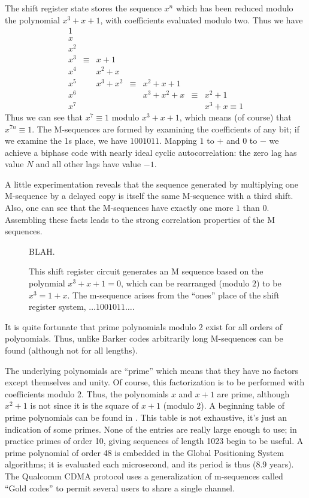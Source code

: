 The shift register state stores the sequence $x^n$ which has been
reduced modulo the polynomial $x^3 + x + 1$, with coefficients
evaluated modulo two.  Thus we have
\begin{equation}
\begin{array}{lclclcl}
1 \\
x \\
x^2 \\
x^3 &\equiv& x+1 \\
x^4 &      & x^2 + x \\
x^5 &      & x^3 + x^2 &\equiv& x^2 + x + 1 \\
x^6 &      &           &      & x^3 + x^2 + x &\equiv&x^2 + 1 \\
x^7 &      &           &      &               &  &x^3 + x \equiv 1
\end{array}
\end{equation}
Thus we can see that $x^7 \equiv 1$ modulo $x^3 + x + 1$, which means
(of course) that $x^{7n} \equiv 1$.  The M-sequences are formed by
examining the coefficients of any bit; if we examine the 1s place, we
have $1001011$.  Mapping $1$ to $+$ and $0$ to $-$ we achieve a
biphase code with nearly ideal cyclic autocorrelation: the zero lag
has value $N$ and all other lags have value $-1$.

A little experimentation reveals that the sequence generated by
multiplying one M-sequence by a delayed copy is itself the same
M-sequence with a third shift.  Also, one can see that the M-sequences
have exactly one more $1$ than $0$.  Assembling these facts leads to
the strong correlation properties of the M sequences.

\begin{figure}
\centerline{\textwidth {}}
BLAH.
\caption{\label{f:mseq1} This shift register circuit generates an M
sequence based on the polynmial $x^3 + x + 1 = 0$, which can be
rearranged (modulo $2$) to be $x^3 = 1 + x$.  The m-sequence arises
from the ``ones'' place of the shift register system, $\ldots 1001011\ldots$.}
\end{figure}

It is quite fortunate that prime polynomials modulo 2 exist for all
orders of polynomials.  Thus, unlike Barker codes arbitrarily long
M-sequences can be found (although not for all lengths).

The underlying polynomials are ``prime'' which means that they have no
factors except themselves and unity.  Of course, this factorization is
to be performed with coefficients modulo 2.  Thus, the polynomials $x$
and $x + 1$ are prime, although $x^2 + 1$ is not since it is the
square of $x+1$ (modulo 2).  A beginning table of prime polynomials
can be found in .  This table is not exhaustive, it's
just an indication of some primes.  None of the entries are really
large enough to use; in practice primes of order 10, giving sequences
of length 1023 begin to be useful.  A prime polynomial of order 48 is
embedded in the Global Positioning System algorithms; it is evaluated
each microsecond, and its period is thus (8.9 years).  The Qualcomm
CDMA protocol uses a generalization of m-sequences called ``Gold
codes'' \cite{uppala-1998,gold-1967,gold-1968} to permit several users
to share a single channel.


